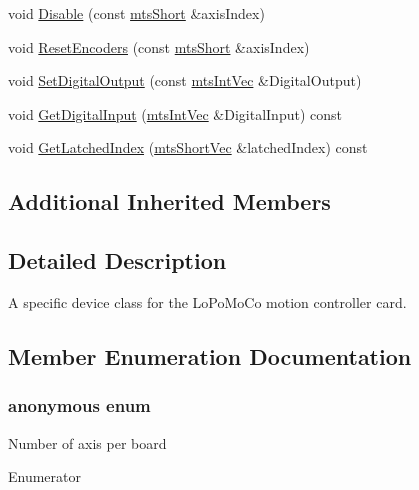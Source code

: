 \begin{DoxyCompactItemize}
\item 
void \hyperlink{classmts_lo_po_mo_co_a55a7c4103f18fb9b3279ed12da42849d}{Disable} (const \hyperlink{mts_generic_object_proxy_8h_a169c76d3ebc9c8cf6c47d54425dc5097}{mts\+Short} \&axis\+Index)
\item 
void \hyperlink{classmts_lo_po_mo_co_a95a68b16d6a6b2e7799b4cd103786056}{Reset\+Encoders} (const \hyperlink{mts_generic_object_proxy_8h_a169c76d3ebc9c8cf6c47d54425dc5097}{mts\+Short} \&axis\+Index)
\item 
void \hyperlink{classmts_lo_po_mo_co_abf4a21b18b765979767e9a582c206bff}{Set\+Digital\+Output} (const \hyperlink{mts_vector_8h_a15d098f238910e70dc542de74110a22e}{mts\+Int\+Vec} \&Digital\+Output)
\item 
void \hyperlink{classmts_lo_po_mo_co_a03f8a16147fba1d76ab98adb3603b673}{Get\+Digital\+Input} (\hyperlink{mts_vector_8h_a15d098f238910e70dc542de74110a22e}{mts\+Int\+Vec} \&Digital\+Input) const 
\item 
void \hyperlink{classmts_lo_po_mo_co_a3e155c3cd605b815fe89878a502a7614}{Get\+Latched\+Index} (\hyperlink{mts_vector_8h_a70974166b1900882680f3002b69e11c5}{mts\+Short\+Vec} \&latched\+Index) const 
\end{DoxyCompactItemize}
\subsection*{Additional Inherited Members}


\subsection{Detailed Description}
A specific device class for the Lo\+Po\+Mo\+Co motion controller card. 

\subsection{Member Enumeration Documentation}
\hypertarget{classmts_lo_po_mo_co_a933389a16a909530cb872cb7e2a03e4e}{}\subsubsection[{anonymous enum}]{\setlength{\rightskip}{0pt plus 5cm}anonymous enum}\label{classmts_lo_po_mo_co_a933389a16a909530cb872cb7e2a03e4e}
Number of axis per board \begin{Desc}
\item[Enumerator]\par
\begin{description}
\item[{\em 
\hypertarget{classmts_lo_po_mo_co_a933389a16a909530cb872cb7e2a03e4eac6dba0b930a9af0a1804587423ca4878}{}N\+B\+\_\+\+A\+X\+I\+S\label{classmts_lo_po_mo_co_a933389a16a909530cb872cb7e2a03e4eac6dba0b930a9af0a1804587423ca4878}
}]\end{description}
\end{Desc}


